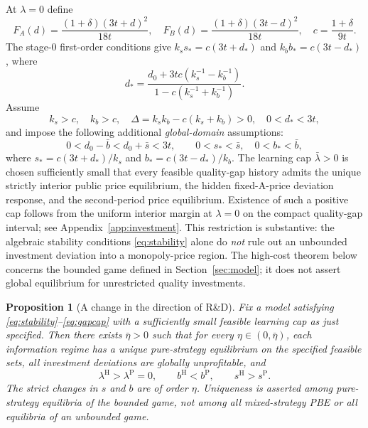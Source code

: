 \documentclass[11pt,a4paper]{article}
\numberwithin{equation}{section}
\newtheorem{proposition}{Proposition}
\theoremstyle{remark}
\newcommand{\PP}{\mathrm{P}}
\newcommand{\HH}{\mathrm{H}}
\begin{document}
At $\lambda=0$ define
\begin{equation}
F_A(d)=\frac{(1+\delta)(3t+d)^2}{18t},\quad
F_B(d)=\frac{(1+\delta)(3t-d)^2}{18t},\quad
c=\frac{1+\delta}{9t}. \label{eq:F}
\end{equation}
The stage-0 first-order conditions give $k_s s_*=c(3t+d_*)$ and $k_b b_*=c(3t-d_*)$, where
\begin{equation}
d_*=
\frac{d_0+3tc(k_s^{-1}-k_b^{-1})}
{1-c(k_s^{-1}+k_b^{-1})}. \label{eq:dstar}
\end{equation}
Assume
\begin{equation}
 k_s>c,\quad k_b>c,\quad
 \Delta=k_sk_b-c(k_s+k_b)>0,\quad
 0<d_*<3t, \label{eq:stability}
\end{equation}
and impose the following additional \emph{global-domain} assumptions:
\begin{equation}
 0<d_0-\bar b<d_0+\bar s<3t,\qquad
 0<s_*<\bar s,\quad 0<b_*<\bar b,
 \label{eq:gapcap}
\end{equation}
where $s_*=c(3t+d_*)/k_s$ and $b_*=c(3t-d_*)/k_b$. The learning cap $\bar\lambda>0$ is chosen sufficiently small that every feasible quality-gap history admits the unique strictly interior public price equilibrium, the hidden fixed-A-price deviation response, and the second-period price equilibrium. Existence of such a positive cap follows from the uniform interior margin at $\lambda=0$ on the compact quality-gap interval; see Appendix~\ref{app:investment}. This restriction is substantive: the algebraic stability conditions \eqref{eq:stability} alone do \emph{not} rule out an unbounded investment deviation into a monopoly-price region. The high-cost theorem below concerns the bounded game defined in Section~\ref{sec:model}; it does not assert global equilibrium for unrestricted quality investments.

\begin{proposition}[A change in the direction of R\&D]\label{prop:composition}
Fix a model satisfying \eqref{eq:stability}--\eqref{eq:gapcap} with a sufficiently small feasible learning cap as just specified. Then there exists $\bar\eta>0$ such that for every $\eta\in(0,\bar\eta)$, each information regime has a unique \emph{pure-strategy} equilibrium on the specified feasible sets, all investment deviations are globally unprofitable, and
\begin{equation}
 \lambda^{\HH}>\lambda^{\PP}=0,\qquad
 b^{\HH}<b^{\PP},\qquad
 s^{\HH}>s^{\PP}. \label{eq:composition}
\end{equation}
The strict changes in $s$ and $b$ are of order $\eta$. Uniqueness is asserted among pure-strategy equilibria of the bounded game, not among all mixed-strategy PBE or all equilibria of an unbounded game.
\end{proposition}
\end{document}
